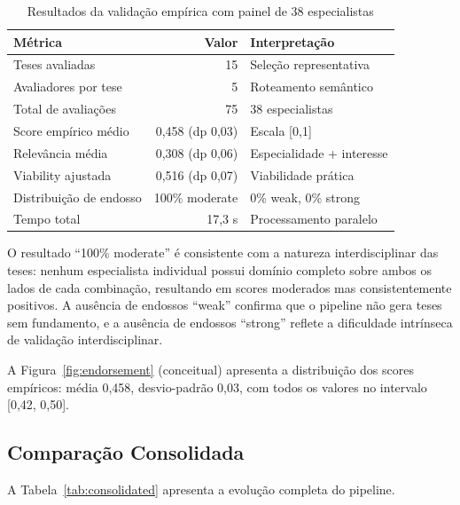 \documentclass[a4paper,12pt]{article}
\begin{document}
\begin{table}[H]
\centering
\caption{Resultados da validação empírica com painel de 38 especialistas}
\label{tab:validation}
\begin{tabular}{lrl}
\toprule
\textbf{Métrica} & \textbf{Valor} & \textbf{Interpretação} \\
\midrule
Teses avaliadas & 15 & Seleção representativa \\
Avaliadores por tese & 5 & Roteamento semântico \\
Total de avaliações & 75 & 38 especialistas \\
Score empírico médio & 0,458 (dp 0,03) & Escala [0,1] \\
Relevância média & 0,308 (dp 0,06) & Especialidade + interesse \\
Viability ajustada & 0,516 (dp 0,07) & Viabilidade prática \\
Distribuição de endosso & 100\% moderate & 0\% weak, 0\% strong \\
Tempo total & 17,3 s & Processamento paralelo \\
\bottomrule
\end{tabular}
\end{table}

O resultado ``100\% moderate'' é consistente com a natureza interdisciplinar das teses: 
nenhum especialista individual possui domínio completo sobre ambos os lados de cada 
combinação, resultando em scores moderados mas consistentemente positivos. A ausência 
de endossos ``weak'' confirma que o pipeline não gera teses sem fundamento, e a 
ausência de endossos ``strong'' reflete a dificuldade intrínseca de validação 
interdisciplinar.

A Figura~\ref{fig:endorsement} (conceitual) apresenta a distribuição dos scores 
empíricos: média 0,458, desvio-padrão 0,03, com todos os valores no intervalo 
[0,42, 0,50].

\subsection{Comparação Consolidada}

A Tabela~\ref{tab:consolidated} apresenta a evolução completa do pipeline.
\end{document}

